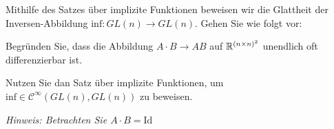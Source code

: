 \begin{Problem}
	Mithilfe des Satzes über implizite Funktionen beweisen wir die Glattheit der Inversen-Abbildung $\text{inf}:GL(n)\to GL(n)$. Gehen Sie wie folgt vor:
	\begin{parts}
	\item Begründen Sie, dass die Abbildung $A\cdot B\to AB$ auf $\mathbb{R}^{(n\times n)^2}$ unendlich oft differenzierbar ist.
	\item Nutzen Sie dan Satz über implizite Funktionen, um $\text{inf}\in \mathcal{C}^\infty (GL(n),GL(n))$ zu beweisen.

		\emph{Hinweis: Betrachten Sie $A\cdot B=\text{Id}$ }
	\end{parts}
\end{Problem}
